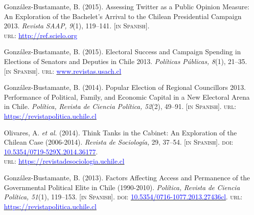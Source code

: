 \begin{publications}
\begin{benumerate}{12}
\item{\small Gonz\'alez-Bustamante, B. (2015). Assessing Twitter as a Public Opinion Measure: An Exploration of the Bachelet's Arrival to the Chilean Presidential Campaign 2013. {\itshape Revista SAAP, 9}(1), 119--141. {\footnotesize \scshape [in Spanish]}. \\ {\scshape url}: \href{http://ref.scielo.org/dwzhns}{\textcolor{blue}{http://ref.scielo.org}}} \vspace{1mm}

\item{\small Gonz\'alez-Bustamante, B. (2015). Electoral Success and Campaign Spending in Elections of Senators and Deputies in Chile 2013. {\itshape Pol\'iticas P\'ublicas, 8}(1), 21--35. {\footnotesize \scshape [in Spanish]}. {\scshape url}: \href{http://www.revistas.usach.cl/ojs/index.php/politicas/article/view/2182}{\textcolor{blue}{www.revistas.usach.cl}}} \vspace{1mm}

\item{\small Gonz\'alez-Bustamante, B. (2014). Popular Election of Regional Councillors 2013. Performance of Political, Family, and Economic Capital in a New Electoral Arena in Chile. {\itshape Pol\'itica, Revista de Ciencia Pol\'itica, 52}(2), 49--91. {\footnotesize \scshape [in Spanish]}. {\scshape url}: \href{https://revistapolitica.uchile.cl/index.php/RP/article/view/36137}{\textcolor{blue}{https://revistapolitica.uchile.cl}}} \vspace{1mm}

\item{\small Olivares, A. {\itshape et al.} (2014). Think Tanks in the Cabinet: An Exploration of the Chilean Case (2006-2014). {\itshape Revista de Sociolog\'ia,} 29, 37--54. {\footnotesize \scshape [in Spanish]}. {\scshape doi}: \href{https://doi.org/10.5354/0719-529X.2014.36177}{\textcolor{blue}{10.5354/0719-529X.2014.36177}}. \\ {\scshape url}: \href{https://revistadesociologia.uchile.cl/index.php/RDS/article/view/36177}{\textcolor{blue}{https://revistadesociologia.uchile.cl}}} \vspace{1mm}

\item{\small Gonz\'alez-Bustamante, B. (2013). Factors Affecting Access and Permanence of the Governmental Political Elite in Chile (1990-2010). {\itshape Pol\'itica, Revista de Ciencia Pol\'itica, 51}(1), 119--153. {\footnotesize \scshape [in Spanish]}. {\scshape doi}: \href{https://doi.org/10.5354/0716-1077.2013.27436}{\textcolor{blue}{10.5354/0716-1077.2013.27436cl}}. {\scshape url}: \href{https://revistapolitica.uchile.cl/index.php/RP/article/view/27436}{\textcolor{blue}{https://revistapolitica.uchile.cl}}} \vspace{1mm}


\end{benumerate}
\end{publications}
